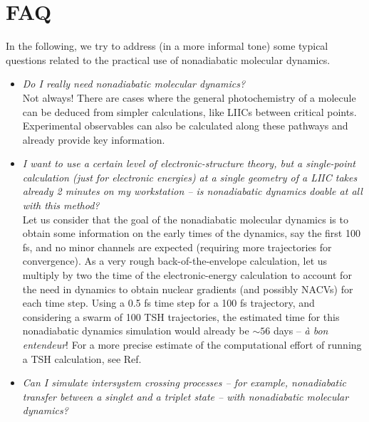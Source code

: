 \documentclass[9pt,bestpractices]{livecoms}
\begin{document}
\section{FAQ}
\label{sec:faq}
In the following, we try to address (in a more informal tone) some typical questions related to the practical use of nonadiabatic molecular dynamics. 
\begin{itemize}

\item{\textit{Do I really need nonadiabatic molecular dynamics?} \\
Not always! There are cases where the general photochemistry of a molecule can be deduced from simpler calculations, like LIICs between critical points. Experimental observables can also be calculated along these pathways and already provide key information. 
}
\item{\textit{I want to use a certain level of electronic-structure theory, but a single-point calculation (just for electronic energies) at a single geometry of a LIIC takes already 2 minutes on my workstation -- is nonadiabatic dynamics doable at all with this method?} \\
Let us consider that the goal of the nonadiabatic molecular dynamics is to obtain some information on the early times of the dynamics, say the first 100 fs, and no minor channels are expected (requiring more trajectories for convergence). As a very rough back-of-the-envelope calculation, let us multiply by two the time of the electronic-energy calculation to account for the need in dynamics to obtain nuclear gradients (and possibly NACVs) for each time step. Using a 0.5 fs time step for a 100 fs trajectory, and considering a swarm of 100 TSH trajectories, the estimated time for this nonadiabatic dynamics simulation would already be $\sim56$ days -- \textit{à bon entendeur}! For a more precise estimate of the computational effort of running a TSH calculation, see Ref.~ 
}
\item{\textit{Can I simulate intersystem crossing processes -- for example, nonadiabatic transfer between a singlet and a triplet state -- with nonadiabatic molecular dynamics?} \\
}
\end{itemize}
\end{document}

